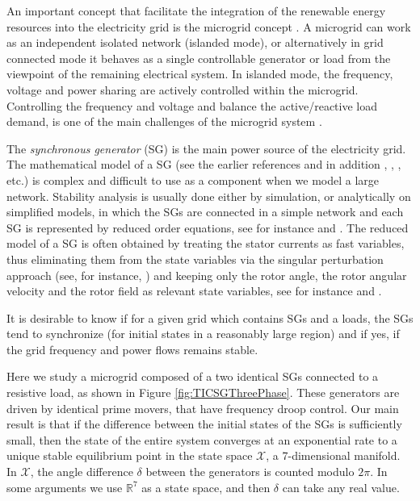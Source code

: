 \documentclass{ifacconf}
\newcommand{\rline}  {{\mathbb R}}
\newcommand{\Xmscr}  {{\mathcal{X}}}
\begin{document}
An important concept that facilitate the integration of the renewable
energy resources into the electricity grid is the microgrid concept
\cite{GreenProdanovic:07,Schiffer_2016_survey}. A microgrid can work 
as an independent isolated network (islanded mode), or alternatively
in grid connected mode it behaves as a single controllable generator 
or load from the viewpoint of the remaining electrical system.
In islanded mode, the frequency, voltage and power sharing are 
actively controlled within the microgrid. Controlling the frequency 
and voltage and balance the active/reactive load demand, is one of 
the main challenges of the microgrid system 
\cite{Shafiee_2016,Zhong:13}.

The {\em synchronous generator} (SG) is the main power source of the
electricity grid. The mathematical model of a SG (see the earlier
references and in addition \cite{Walker:94}, \cite{Fitzgerald:03},
\cite{MaWe:15}, etc.) is complex and difficult to use as a component
when we model a large network. Stability analysis is usually done
either by simulation, or analytically on simplified models, in which
the SGs are connected in a simple network and each SG is represented
by reduced order equations, see for instance \cite{DoBull:12} and
\cite{PoDoBu:13}. The reduced model of a SG is often obtained by
treating the stator currents as fast variables, thus eliminating them
from the state variables via the singular perturbation approach (see,
for instance, \cite{Khalil}) and keeping only the rotor angle, the
rotor angular velocity and the rotor field as relevant state
variables, see for instance \cite{Kundur} and \cite{SauerPai1998}.

It is desirable to know if for a given grid which contains SGs and a
loads, the SGs tend to synchronize (for initial states in a reasonably
large region) and if yes, if the grid frequency and power flows
remains stable. 

Here we study a microgrid composed of a two identical SGs connected to
a resistive load, as shown in Figure \ref{fig:TICSGThreePhase}. These
generators are driven by identical prime movers, that have frequency
droop control. Our main result is that if the difference between the
initial states of the SGs is sufficiently small, then the state of the
entire system converges at an exponential rate to a unique stable
equilibrium point in the state space $\Xmscr$, a 7-dimensional
manifold. In $\Xmscr$, the angle difference $\delta$ between the
generators is counted modulo $2\pi$. In some arguments we use
$\rline^7$ as a state space, and then $\delta$ can take any real
value.
\end{document}
